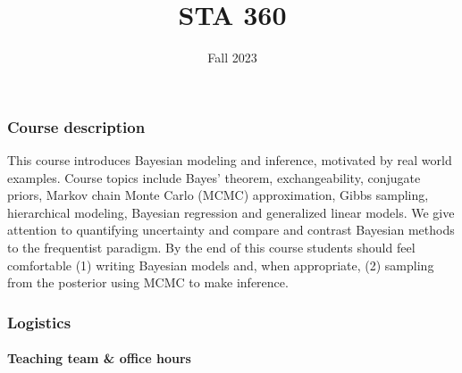 \documentclass[
  letterpaper,
  DIV=11,
  numbers=noendperiod]{scrartcl}
\title{STA 360}
\subtitle{Fall 2023}
\author{}
\date{}
\let\oldparagraph\paragraph
\renewcommand{\paragraph}[1]{\oldparagraph{#1}\mbox{}}
\begin{document}
\maketitle
\ifdefined\Shaded\renewenvironment{Shaded}{\begin{tcolorbox}[enhanced, breakable, frame hidden, sharp corners, borderline west={3pt}{0pt}{shadecolor}, interior hidden, boxrule=0pt]}{\end{tcolorbox}}\fi

\hypertarget{course-description}{%
\subsubsection{Course description}\label{course-description}}

This course introduces Bayesian modeling and inference, motivated by
real world examples. Course topics include Bayes' theorem,
exchangeability, conjugate priors, Markov chain Monte Carlo (MCMC)
approximation, Gibbs sampling, hierarchical modeling, Bayesian
regression and generalized linear models. We give attention to
quantifying uncertainty and compare and contrast Bayesian methods to the
frequentist paradigm. By the end of this course students should feel
comfortable (1) writing Bayesian models and, when appropriate, (2)
sampling from the posterior using MCMC to make inference.

\hypertarget{logistics}{%
\subsubsection{Logistics}\label{logistics}}

\hypertarget{teaching-team-office-hours}{%
\paragraph{Teaching team \& office
hours}\label{teaching-team-office-hours}}
\end{document}

